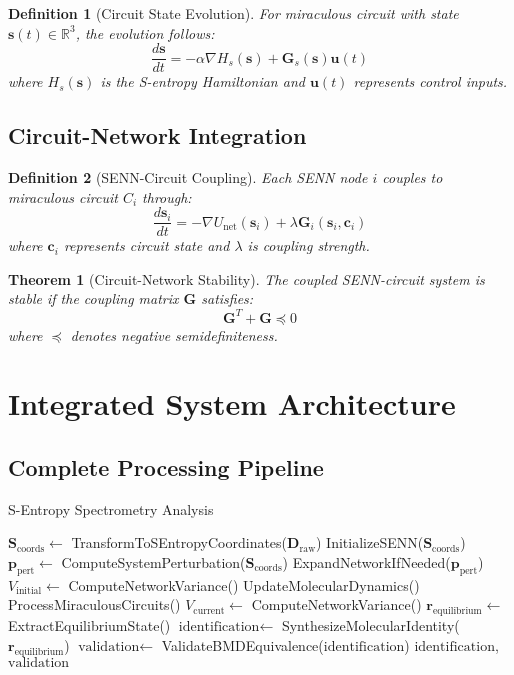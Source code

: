 \documentclass[12pt,a4paper]{article}
\newtheorem{theorem}{Theorem}
\newtheorem{definition}{Definition}
\begin{document}
\begin{definition}[Circuit State Evolution]
For miraculous circuit with state $\mathbf{s}(t) \in \mathbb{R}^3$, the evolution follows:
$$\frac{d\mathbf{s}}{dt} = -\alpha \nabla H_s(\mathbf{s}) + \mathbf{G}_s(\mathbf{s})\mathbf{u}(t)$$
where $H_s(\mathbf{s})$ is the S-entropy Hamiltonian and $\mathbf{u}(t)$ represents control inputs.
\end{definition}

\subsection{Circuit-Network Integration}

\begin{definition}[SENN-Circuit Coupling]
Each SENN node $i$ couples to miraculous circuit $C_i$ through:
$$\frac{d\mathbf{s}_i}{dt} = -\nabla U_{\text{net}}(\mathbf{s}_i) + \lambda \mathbf{G}_i(\mathbf{s}_i, \mathbf{c}_i)$$
where $\mathbf{c}_i$ represents circuit state and $\lambda$ is coupling strength.
\end{definition}

\begin{theorem}[Circuit-Network Stability]
The coupled SENN-circuit system is stable if the coupling matrix $\mathbf{G}$ satisfies:
$$\mathbf{G}^T + \mathbf{G} \preceq 0$$
where $\preceq$ denotes negative semidefiniteness.
\end{theorem}

\section{Integrated System Architecture}

\subsection{Complete Processing Pipeline}

\begin{algorithm}[H]
\caption{S-Entropy Spectrometry Analysis}
\begin{algorithmic}[1]
    \State $\mathbf{S}_{\text{coords}} \gets$ TransformToSEntropyCoordinates($\mathbf{D}_{\text{raw}}$)
    \State InitializeSENN($\mathbf{S}_{\text{coords}}$)
    \State $\mathbf{p}_{\text{pert}} \gets$ ComputeSystemPerturbation($\mathbf{S}_{\text{coords}}$)
    \State ExpandNetworkIfNeeded($\mathbf{p}_{\text{pert}}$)
    \State $V_{\text{initial}} \gets$ ComputeNetworkVariance()
        \State UpdateMolecularDynamics()
        \State ProcessMiraculousCircuits()
        \State $V_{\text{current}} \gets$ ComputeNetworkVariance()
    \EndWhile
    \State $\mathbf{r}_{\text{equilibrium}} \gets$ ExtractEquilibriumState()
    \State $\text{identification} \gets$ SynthesizeMolecularIdentity($\mathbf{r}_{\text{equilibrium}}$)
    \State $\text{validation} \gets$ ValidateBMDEquivalence($\text{identification}$)
    \State \Return $\text{identification}$, $\text{validation}$
\EndProcedure
\end{algorithmic}
\end{algorithm}
\end{document}
